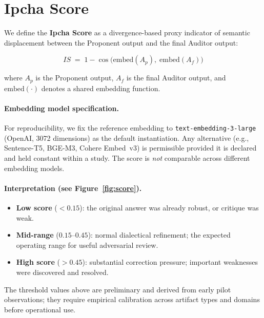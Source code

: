 \documentclass[11pt,a4paper]{article}
\begin{document}
\section{Ipcha Score}
\label{sec:score}

We define the \textbf{Ipcha Score} as a divergence-based proxy indicator of semantic displacement between the Proponent output and the final Auditor output:

\begin{equation}
  \mathit{IS} \;=\; 1 - \cos\!\bigl(\mathrm{embed}(A_p),\;\mathrm{embed}(A_f)\bigr)
  \label{eq:ipcha-score}
\end{equation}

\noindent where $A_p$ is the Proponent output, $A_f$ is the final Auditor output, and $\mathrm{embed}(\cdot)$ denotes a shared embedding function.

\paragraph{Embedding model specification.}
For reproducibility, we fix the reference embedding to \texttt{text-embedding-3-large} (OpenAI, 3072 dimensions) as the default instantiation.
Any alternative (e.g., Sentence-T5, BGE-M3, Cohere Embed~v3) is permissible provided it is declared and held constant within a study.
The score is \emph{not} comparable across different embedding models.

\paragraph{Interpretation (see Figure~\ref{fig:score}).}
\begin{itemize}
  \item \textbf{Low score} ($< 0.15$): the original answer was already robust, or critique was weak.
  \item \textbf{Mid-range} ($0.15$--$0.45$): normal dialectical refinement; the expected operating range for useful adversarial review.
  \item \textbf{High score} ($> 0.45$): substantial correction pressure; important weaknesses were discovered and resolved.
\end{itemize}

\noindent The threshold values above are preliminary and derived from early pilot observations; they require empirical calibration across artifact types and domains before operational use.
\end{document}
